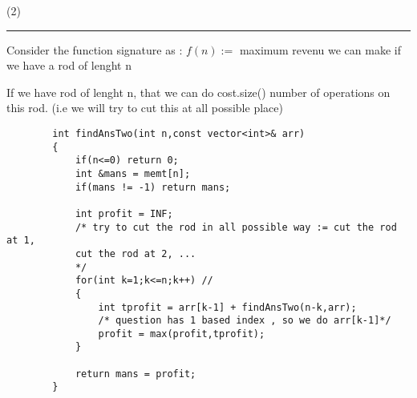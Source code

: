 \begin{solution}
    (2)
    \vspace{3mm}
    \hrule
    
    \begin{intution}
        Consider the function signature as :
        $f(n) :=$ maximum revenu we can make if we have a rod of lenght n
    \end{intution}

    If we have rod of lenght n, that we can do cost.size() number of operations on this rod. (i.e we will try to cut this at all possible place)

    \begin{verbatim}
        int findAnsTwo(int n,const vector<int>& arr)
        {
            if(n<=0) return 0;
            int &mans = memt[n];
            if(mans != -1) return mans;

            int profit = INF;
            /* try to cut the rod in all possible way := cut the rod at 1,
            cut the rod at 2, ...
            */
            for(int k=1;k<=n;k++) //
            {
                int tprofit = arr[k-1] + findAnsTwo(n-k,arr); 
                /* question has 1 based index , so we do arr[k-1]*/
                profit = max(profit,tprofit);
            }

            return mans = profit;
        }
    \end{verbatim}
    
\end{solution}

